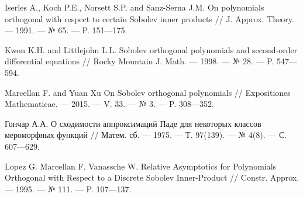 \begin{thebibliography}{99}
Iserles A., Koch P.E., Norsett S.P. and Sanz-Serna J.M. On polynomials  orthogonal  with respect  to certain Sobolev inner products // J. Approx. Theory. --- 1991. --- № 65. --- P. 151---175.





Kwon K.H. and Littlejohn L.L. Sobolev orthogonal polynomials and second-order differential equations // Rocky Mountain J. Math. --- 1998. --- № 28. --- P. 547---594.





Marcellan F. and Yuan Xu On Sobolev orthogonal polynomials // Expositiones Mathematicae. --- 2015. --- V. 33. --- № 3. --- P. 308---352.





Гончар А.А. О сходимости аппроксимаций Паде для некоторых классов мероморфных функций // Матем. сб. --- 1975. --- Т. 97(139). --- № 4(8). --- С. 607---629.





Lopez G. Marcellan F. Vanassche W. Relative Asymptotics for Polynomials Orthogonal with Respect to a Discrete Sobolev Inner-Product // Constr. Approx. --- 1995. --- № 111. --- P. 107---137.




\end{thebibliography}